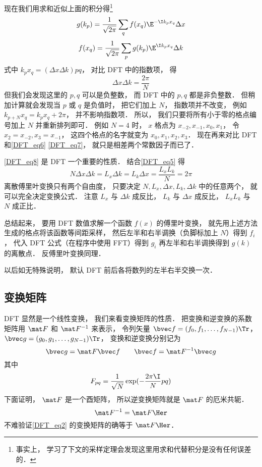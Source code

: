现在我们用求和近似上面的积分得\footnote{事实上， 学习了下文的采样定理会发现这里用求和代替积分是没有任何误差的．}
\begin{equation}\label{DFT_eq6}
g(k_p) = \frac{1}{\sqrt{2\pi}} \sum_q f(x_q) \E^{-\I k_p x_q} \Delta x
\end{equation}
\begin{equation}\label{DFT_eq7}
f(x_q) = \frac{1}{\sqrt{2\pi}} \sum_p g(k_p) \E^{\I k_p x_q} \Delta k
\end{equation}
式中 $k_p x_q = (\Delta x \Delta k)pq$， 对比 DFT 中的指数项， 得
\begin{equation}\label{DFT_eq8}
\Delta x\Delta k = \frac{2\pi}{N}
\end{equation}
但我们会发现这里的 $p, q$ 可以是负整数， 而 DFT 中的 $p, q$ 都是非负整数． 但稍加计算就会发现当 $p$ 或 $q$ 是负值时， 把它们加上 $N$， 指数项并不改变， 例如 $k_{p+N} x_q = k_p x_q + 2\pi$， 并不影响指数项． 所以， 我们只要将所有小于零的格点编号加上 $N$ 并重新排列即可． 例如 $N = 4$ 时， $x$ 格点为 $x_{-2}, x_{-1}, x_0, x_1$， 令 $x_2 = x_{-2}, x_3 = x_{-1}$， 这四个格点的名字就变为 $x_0, x_1, x_2, x_3$． 现在再来对比 DFT 和\autoref{DFT_eq6} \autoref{DFT_eq7}， 就只是相差两个常数因子而已了．

\autoref{DFT_eq8} 是 DFT 一个重要的性质． 结合\autoref{DFT_eq5} 得
\begin{equation}\label{DFT_eq9}
N\Delta x \Delta k = L_x \Delta k = L_k \Delta x = \frac{L_x L_k}{N} = 2\pi
\end{equation}
离散傅里叶变换只有两个自由度， 只要决定 $N, L_x, \Delta x, L_k, \Delta k$ 中的任意两个， 就可以完全决定变换公式． 注意 $L_x$ 与 $\Delta k$ 成反比， $L_k$ 与 $\Delta x$ 成反比， $L_xL_k$ 与 $N$ 成正比．

总结起来， 要用 DFT 数值求解一个函数 $f(x)$ 的傅里叶变换， 就先用上述方法生成的格点将该函数等间距采样， 然后左半和右半调换（负脚标加上 $N$）得到 $f_i$， 代入 DFT 公式（在程序中使用 FFT）得到 $g_i$ 再左半和右半调换得到 $g(k)$ 的离散点． 反傅里叶变换同理．

以后如无特殊说明， 默认 DFT 前后各将数列的左半右半交换一次．

\subsection{变换矩阵}
DFT 显然是一个线性变换， 我们来看变换矩阵的性质． 把变换和逆变换的系数矩阵用
 $\mat F$ 和 $\mat F^{-1}$ 来表示， 令列矢量 $\bvec f = (f_0,f_1,\dots,f_{N-1})\Tr$， $\bvec g = (g_0,g_1,\dots,g_{N-1})\Tr$， 变换和逆变换分别记为
\begin{equation}
\bvec g = \mat F \bvec f \qquad
\bvec f = \mat F^{-1} \bvec g
\end{equation}
其中
\begin{equation}
F_{pq} = \frac{1}{\sqrt{N}} \exp(-\frac{2\pi\I}{N} p q)
\end{equation}
下面证明， $\mat F$ 是一个酉矩阵， 所以逆变换矩阵就是 $\mat F$ 的厄米共轭．
\begin{equation}
\mat F^{-1} = \mat F\Her
\end{equation}
不难验证\autoref{DFT_eq2} 的变换矩阵的确等于 $\mat F\Her$．

